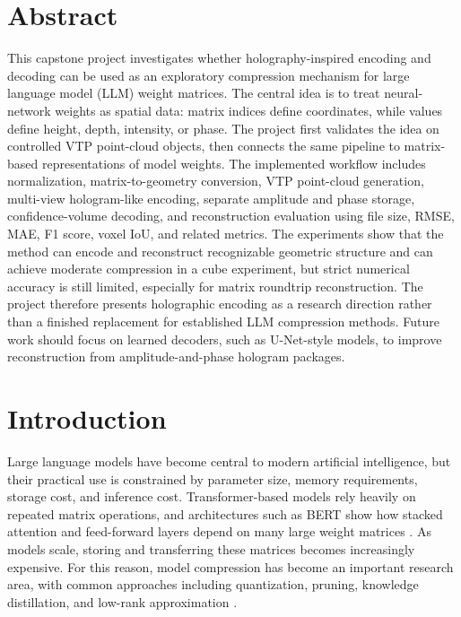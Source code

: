 \documentclass{article}
\begin{document}
    \begin{normalsize}
    
    	\section{Abstract}

This capstone project investigates whether holography-inspired encoding and decoding can be used as an exploratory compression mechanism for large language model (LLM) weight matrices. The central idea is to treat neural-network weights as spatial data: matrix indices define coordinates, while values define height, depth, intensity, or phase. The project first validates the idea on controlled VTP point-cloud objects, then connects the same pipeline to matrix-based representations of model weights. The implemented workflow includes normalization, matrix-to-geometry conversion, VTP point-cloud generation, multi-view hologram-like encoding, separate amplitude and phase storage, confidence-volume decoding, and reconstruction evaluation using file size, RMSE, MAE, F1 score, voxel IoU, and related metrics. The experiments show that the method can encode and reconstruct recognizable geometric structure and can achieve moderate compression in a cube experiment, but strict numerical accuracy is still limited, especially for matrix roundtrip reconstruction. The project therefore presents holographic encoding as a research direction rather than a finished replacement for established LLM compression methods. Future work should focus on learned decoders, such as U-Net-style models, to improve reconstruction from amplitude-and-phase hologram packages.

\section{Introduction}

Large language models have become central to modern artificial intelligence, but their practical use is constrained by parameter size, memory requirements, storage cost, and inference cost. Transformer-based models rely heavily on repeated matrix operations, and architectures such as BERT show how stacked attention and feed-forward layers depend on many large weight matrices \cite{vaswani2017,devlin2019}. As models scale, storing and transferring these matrices becomes increasingly expensive. For this reason, model compression has become an important research area, with common approaches including quantization, pruning, knowledge distillation, and low-rank approximation \cite{zhu2024survey}.


\end{normalsize}
\end{document}
